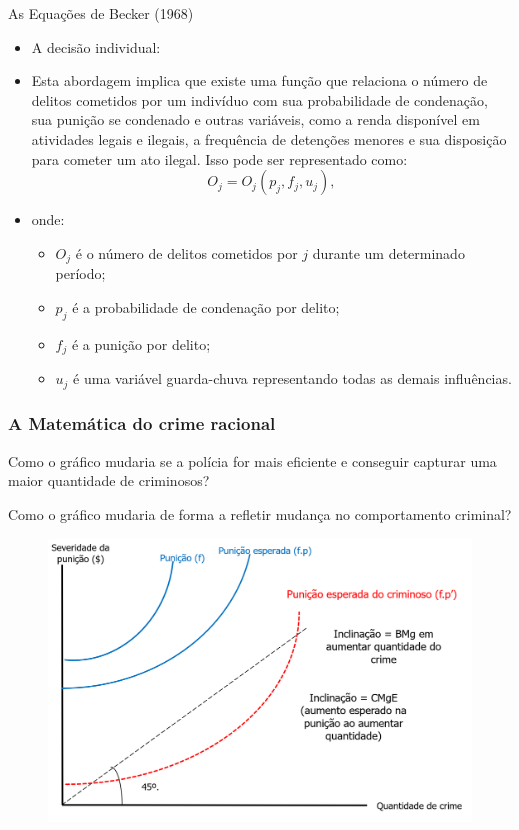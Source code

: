 \documentclass[a4paper,12pt]{article}[abntex2]
\begin{document}
As Equações de Becker (1968)\begin{itemize}
    \item A decisão individual:
    \item Esta abordagem implica que existe uma função que relaciona o número de delitos cometidos por um indivíduo com sua probabilidade de condenação, sua punição se condenado e outras variáveis, como a renda disponível em atividades legais e ilegais, a frequência de detenções menores e sua disposição para cometer um ato ilegal. Isso pode ser representado como:
    \[
    O_j = O_j(p_j, f_j, u_j),
    \]
    \item onde: 
    \begin{itemize}
        \item $O_j$ é o número de delitos cometidos por $j$ durante um determinado período;
        \item $p_j$ é a probabilidade de condenação por delito;
        \item $f_j$ é a punição por delito;
        \item $u_j$ é uma variável guarda-chuva representando todas as demais influências.
    \end{itemize}
\end{itemize}

\subsubsection{\textbf{A Matemática do crime racional}}
Como o gráfico mudaria se a polícia for mais eficiente e conseguir capturar uma maior quantidade de criminosos?

Como o gráfico mudaria de forma a refletir mudança no comportamento criminal?

\begin{figure}[H]
    \centering
    \includegraphics[width=0.7\linewidth]{Imagens/a19i6.png}
\end{figure}
\end{document}
